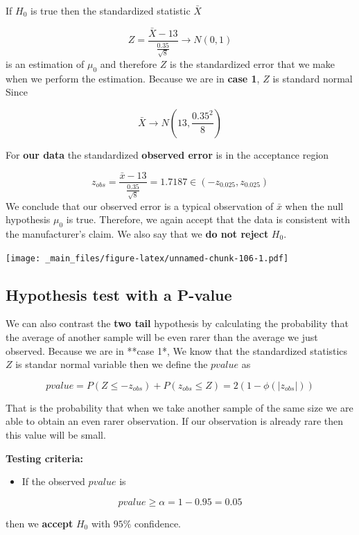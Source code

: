 \documentclass[
]{book}
\providecommand{\tightlist}{%
  \setlength{\itemsep}{0pt}\setlength{\parskip}{0pt}}
\begin{document}
If \(H_0\) is true then the standardized statistic \(\bar{X}\)

\[Z=\frac{\bar{X}-13}{\frac{0.35}{\sqrt{8}}}  \rightarrow N(0,1)\]
is an estimation of \(\mu_0\) and therefore \(Z\) is the standardized error that we make when we perform the estimation. Because we are in \textbf{case 1}, \(Z\) is standard normal
Since

\[\bar{X} \rightarrow N(13, \frac{0.35^2}{8})\]

For \textbf{our data} the standardized \textbf{observed error} is in the acceptance region

\[z_{obs}=\frac{\bar{x}-13}{\frac{0.35}{\sqrt{8}}}=1.7187 \in (-z_{0.025}, z_{0.025})\]
We conclude that our observed error is a typical observation of \(\bar{x}\) when the null hypothesis \(\mu_0\) is true. Therefore, we again accept that the data is consistent with the manufacturer's claim. We also say that we \textbf{do not reject} \(H_0\).

\texttt{[image: \_main\_files/figure-latex/unnamed-chunk-106-1.pdf]}

\hypertarget{hypothesis-test-with-a-p-value}{%
\subsection{Hypothesis test with a P-value}\label{hypothesis-test-with-a-p-value}}

We can also contrast the \textbf{two tail} hypothesis by calculating the probability that the average of another sample will be even rarer than the average we just observed. Because we are in **case 1*, We know that the standardized statistics \(Z\) is standar normal variable then we define the \(pvalue\) as

\[pvalue = P(Z \leq -z_{obs}) + P(z_{obs} \leq Z) = 2 (1-\phi(|z_{obs}|))\]

That is the probability that when we take another sample of the same size we are able to obtain an even rarer observation. If our observation is already rare then this value will be small.

\textbf{Testing criteria:}

\begin{itemize}
\tightlist
\item
  If the observed \(pvalue\) is
\end{itemize}

\[pvalue \geq \alpha =1-0.95=0.05\]

then we \textbf{accept} \(H_0\) with \(95\%\) confidence.
\end{document}
